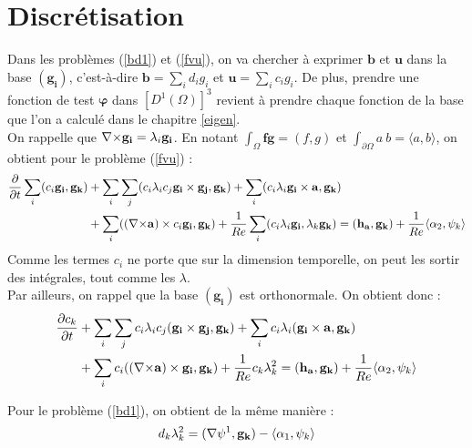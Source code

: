 \section{Discrétisation}
\label{discr}

Dans les problèmes (\ref{bd1}) et (\ref{fvu}), on va chercher à exprimer $\mathbf{b}$ et $\mathbf{u}$ dans la base $(\mathbf{g_i})$, c'est-à-dire $\mathbf{b}=\sum_i d_ig_i$ et $\mathbf{u}=\sum_i c_ig_i$. De plus, prendre une fonction de test $\bm{\varphi}$ dans $[D^1(\Omega)]^3$ revient à prendre chaque fonction de la base que l'on a calculé dans le chapitre \ref{eigen}.\\
On rappelle que ${\nabla\times} \mathbf{g_i}=\lambda_i\mathbf{g_i}$. En notant $\int_\Omega \mathbf{f}\mathbf{g}=(f,g)$ et $\int_{\partial\Omega}a\ b=\langle a,b\rangle$, on obtient pour le problème (\ref{fvu}) :
\begin{align*}
\frac{\partial}{\partial t}\sum_i (c_i\mathbf{g_i}, \mathbf{g_k}) &+ \sum_i\sum_j (c_i\lambda_ic_j\mathbf{g_i}\times \mathbf{g_j},\mathbf{g_k}) + \sum_i(c_i\lambda_i\mathbf{g_i}\times \mathbf{a},\mathbf{g_k})\\
&+ \sum_i (({\nabla\times} \mathbf{a})\times c_i\mathbf{g_i},\mathbf{g_k}) + \frac{1}{Re}\sum_i(c_i\lambda_i\mathbf{g_i}, \lambda_k\mathbf{g_k}) = (\mathbf{h_a},\mathbf{g_k}) + \frac{1}{Re}\langle\alpha_2,\psi_k\rangle
\end{align*}
Comme les termes $c_i$ ne porte que sur la dimension temporelle, on peut les
sortir des intégrales, tout comme les $\lambda$.\\

Par ailleurs, on rappel que la base $(\mathbf{g_i})$ est orthonormale. On obtient donc :
\begin{equation}
\label{fvspec}
\begin{aligned}
\frac{\partial c_k}{\partial t} &+ \sum_i\sum_j c_i\lambda_i c_j(\mathbf{g_i}\times \mathbf{g_j}, \mathbf{g_k}) + \sum_i c_i\lambda_i(\mathbf{g_i}\times \mathbf{a},\mathbf{g_k})\\
&+ \sum_i c_i(({\nabla\times} \mathbf{a})\times \mathbf{g_i}, \mathbf{g_k}) + \frac{1}{Re}c_k\lambda_k^2 = (\mathbf{h_a},\mathbf{g_k}) + \frac{1}{Re}\langle\alpha_2,\psi_k\rangle
\end{aligned}
\end{equation}

Pour le problème (\ref{bd1}), on obtient de la même manière :
\begin{equation}
\label{discbd1}
d_k\lambda_k^2 = ({\nabla}\psi^1,\mathbf{g_k}) - \langle\alpha_1,\psi_k\rangle
\end{equation}

